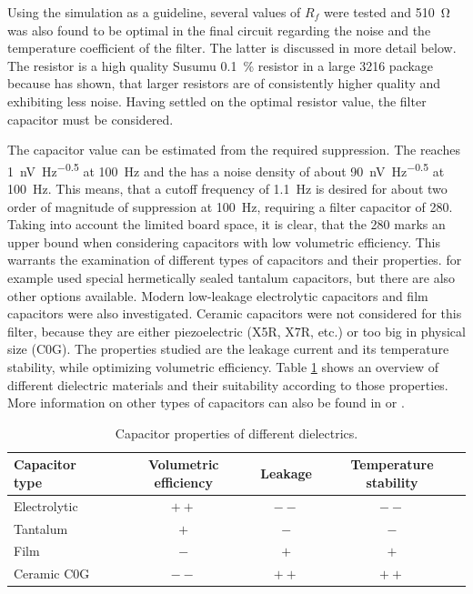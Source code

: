 Using the simulation as a guideline, several values of $R_{f}$ were tested and \qty{510}{\ohm} was also found to be optimal in the final circuit regarding the noise and the temperature coefficient of the filter. The latter is discussed in more detail below. The resistor is a high quality Susumu  \qty{0.1}{\percent} resistor in a large 3216 package because \citeauthor{resistor_current_noise_ligo} \cite{resistor_current_noise_ligo} has shown, that larger resistors are of consistently higher quality and exhibiting less noise. Having settled on the optimal resistor value, the filter capacitor must be considered.

The capacitor value can be estimated from the required suppression. The  reaches \qty{1}{\nV \Hz\tothe{-0.5}} at \qty{100}{\Hz} and the  has a noise density of about \qty{90}{\nV \Hz\tothe{-0.5}} at \qty{100}{\Hz}. This means, that a cutoff frequency of \qty{1.1}{\Hz} is desired for about two order of magnitude of suppression at \qty{100}{\Hz}, requiring a filter capacitor of \qty{280}{\uF}. Taking into account the limited board space, it is clear, that the \qty{280}{\uF} marks an upper bound when considering capacitors with low volumetric efficiency. This warrants the examination of different types of capacitors and their properties. \citeauthor{libbrecht_hall} \cite{libbrecht_hall} for example used special hermetically sealed tantalum capacitors, but there are also other options available. Modern low-leakage electrolytic capacitors and film capacitors were also investigated. Ceramic capacitors were not considered for this filter, because they are either piezoelectric (X5R, X7R, etc.) or too big in physical size (C0G). The properties studied are the leakage current and its temperature stability, while optimizing volumetric efficiency. Table \ref{tab:capacitor_properties} shows an overview of different dielectric materials and their suitability according to those properties. More information on other types of capacitors can also be found in \cite{linear_circuit_design_handbook} or \cite{basic_linear_design}.
\begin{table}[ht]
    \centering
    \begin{tabular}{lccc}
        \toprule
        Capacitor type& Volumetric efficiency & Leakage& Temperature stability\\
        \midrule
        Electrolytic & $++$ & $--$ & $--$\\
        Tantalum & $+$ & $-$ & $-$\\
        Film & $-$ & $+$ & $+$\\
        Ceramic C0G & $--$ & $++$ & $++$\\
        \bottomrule
    \end{tabular}
    \caption{Capacitor properties of different dielectrics.}
    \label{tab:capacitor_properties}
\end{table}

